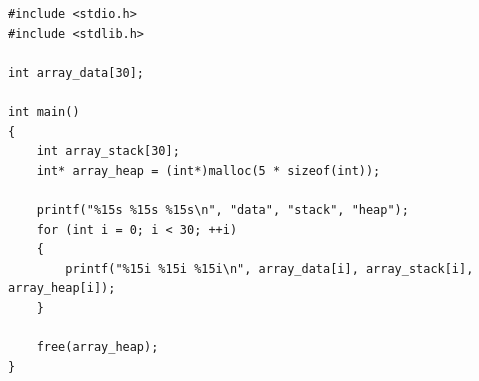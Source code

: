 \documentclass{article}
\begin{document}
\newpage


\begin{lstlisting}
#include <stdio.h>
#include <stdlib.h>

int array_data[30];

int main() 
{
    int array_stack[30];
    int* array_heap = (int*)malloc(5 * sizeof(int));
    
    printf("%15s %15s %15s\n", "data", "stack", "heap");
    for (int i = 0; i < 30; ++i)
    {
        printf("%15i %15i %15i\n", array_data[i], array_stack[i], array_heap[i]);
    }
    
    free(array_heap);
}
\end{lstlisting}
\end{document}
